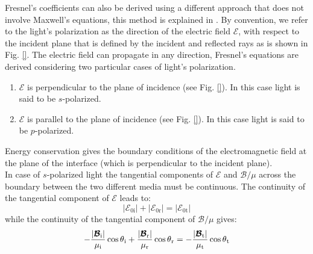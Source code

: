 Fresnel's coefficients can also be derived using a different approach that does not involve Maxwell's equations, this method is explained in \cite{feynman2011feynman}. 
By convention, we refer to the light's polarization as the direction of the electric field $\boldsymbol{\mathcal{E}}$, \cite{feynman1964feynman} with respect to the incident plane that is defined by the incident and reflected rays as is shown in Fig. \ref{}. The electric field can propagate in any direction, Fresnel's equations are derived considering two particular cases of light's polarization. 
\begin{enumerate}
\item $\boldsymbol{\mathcal{E}}$ is perpendicular to the plane of incidence (see Fig. \ref{}). In this case  light is said to be $s$-polarized.
\item $\boldsymbol{\mathcal{E}}$ is parallel to the plane of incidence (see Fig. \ref{}). In this case light is said to be $p$-polarized.
\end{enumerate}
Energy conservation gives the boundary conditions of the electromagnetic field at the plane of the interface (which is perpendicular to the incident plane). \\ 
\indent In case of $s$-polarized light the tangential components of $\boldsymbol{\mathcal{E}}$ and $\boldsymbol{\mathcal{B}}/\mu$ across the boundary between the two different media must be continuous. The continuity of the tangential component of $\boldsymbol{\mathcal{E}}$ leads to:
\begin{equation}\label{Econservation}
|\boldsymbol{\mathcal{E}}_{0\textrm{i}}|+|\boldsymbol{\mathcal{E}}_{0\textrm{r}}|= |\boldsymbol{\mathcal{E}}_{0\textrm{t}}|
\end{equation} 
while the continuity of the tangential component of $\boldsymbol{\mathcal{B}}/\mu$ gives:
\begin{equation}\label{Bconservation}
-\frac{|\boldsymbol{\mathcal{B}}_{\textrm{i}}|}{\mu_\textrm{i}}\cos\mbox{$\theta$}_{\textrm{i}}+\frac{|\boldsymbol{\mathcal{B}}_{\textrm{r}}|}{\mu_\textrm{r}}\cos\mbox{$\theta$}_{\textrm{r}} = 
-\frac{|\boldsymbol{\mathcal{B}}_{\textrm{t}}|}{\mu_\textrm{t}}\cos\mbox{$\theta$}_{\textrm{t}}
\end{equation}
